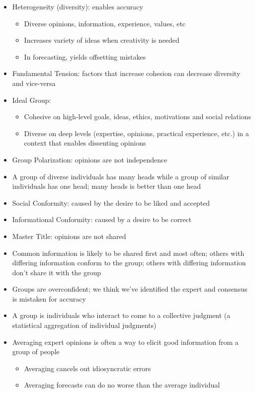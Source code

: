 \documentclass[12pt]{article}
\begin{document}
\begin{itemize}
\item Heterogeneity (diversity): enables accuracy \begin{itemize} 
\item Diverse opinions, information, experience, values, etc
\item Increases variety of ideas when creativity is needed 
\item In forecasting, yields offsetting mistakes \end{itemize} 
\item Fundamental Tension: factors that increase cohesion can decrease diversity and vice-versa 
\item Ideal Group: \begin{itemize} 
\item Cohesive on high-level goals, ideas, ethics, motivations and social relations 
\item Diverse on deep levels (expertise, opinions, practical experience, etc.) in a context that enables dissenting opinions \end{itemize} 
\item Group Polarization: opinions are not independence
\item A group of diverse individuals has many heads while a group of similar individuals has one head; many heads is better than one head 
\item Social Conformity: caused by the desire to be liked and accepted 
\item Informational Conformity: caused by a desire to be correct 
\item Master Title: opinions are not shared 
\item Common information is likely to be shared first and most often; others with differing information conform to the group; others with differing information don't share it with the group 
\item Groups are overconfident; we think we've identified the expert and consensus is mistaken for accuracy 
\item A group is individuals who interact to come to a collective judgment (a statistical aggregation of individual judgments) 
\item Averaging expert opinions is often a way to elicit good information from a group of people \begin{itemize} 
\item Averaging cancels out idiosyncratic errors 
\item Averaging forecasts can do no worse than the average individual 

\end{itemize}
\end{itemize}
\end{document}
